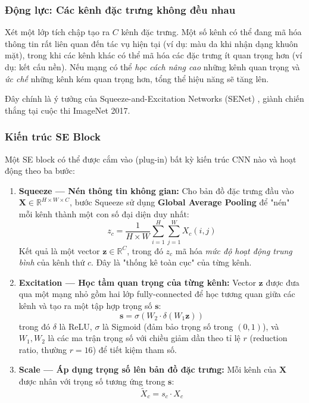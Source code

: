 \subsubsection{Động lực: Các kênh đặc trưng không đều nhau}
\label{subsubsec:senet_motivation}

Xét một lớp tích chập tạo ra $C$ kênh đặc trưng. Một số kênh có thể đang mã hóa thông tin rất liên quan đến tác vụ hiện tại (ví dụ: màu da khi nhận dạng khuôn mặt), trong khi các kênh khác có thể mã hóa các đặc trưng ít quan trọng hơn (ví dụ: kết cấu nền). Nếu mạng có thể \textit{học cách nâng cao} những kênh quan trọng và \textit{ức chế} những kênh kém quan trọng hơn, tổng thể hiệu năng sẽ tăng lên.

Đây chính là ý tưởng của Squeeze-and-Excitation Networks (SENet) \cite{Hu2018}, giành chiến thắng tại cuộc thi ImageNet 2017.

\subsubsection{Kiến trúc SE Block}
\label{subsubsec:senet_architecture}

Một SE block có thể được cắm vào (plug-in) bất kỳ kiến trúc CNN nào và hoạt động theo ba bước:

\begin{enumerate}
    \item \textbf{Squeeze — Nén thông tin không gian:}
    Cho bản đồ đặc trưng đầu vào $\mathbf{X} \in \mathbb{R}^{H \times W \times C}$, bước Squeeze sử dụng \textbf{Global Average Pooling} để "nén" mỗi kênh thành một con số đại diện duy nhất:
    \[
        z_c = \frac{1}{H \times W} \sum_{i=1}^{H} \sum_{j=1}^{W} X_c(i, j)
    \]
    Kết quả là một vector $\mathbf{z} \in \mathbb{R}^C$, trong đó $z_c$ mã hóa \textit{mức độ hoạt động trung bình} của kênh thứ $c$. Đây là "thống kê toàn cục" của từng kênh.

    \item \textbf{Excitation — Học tầm quan trọng của từng kênh:}
    Vector $\mathbf{z}$ được đưa qua một mạng nhỏ gồm hai lớp fully-connected để học tương quan giữa các kênh và tạo ra một tập hợp trọng số $\mathbf{s}$:
    \[
        \mathbf{s} = \sigma\!\left(W_2 \cdot \delta\!\left(W_1 \mathbf{z}\right)\right)
    \]
    trong đó $\delta$ là ReLU, $\sigma$ là Sigmoid (đảm bảo trọng số trong $(0, 1)$), và $W_1, W_2$ là các ma trận trọng số với chiều giảm dần theo tỉ lệ $r$ (reduction ratio, thường $r=16$) để tiết kiệm tham số.

    \item \textbf{Scale — Áp dụng trọng số lên bản đồ đặc trưng:}
    Mỗi kênh của $\mathbf{X}$ được nhân với trọng số tương ứng trong $\mathbf{s}$:
    \[
        \tilde{X}_c = s_c \cdot X_c
    \]
\end{enumerate}

